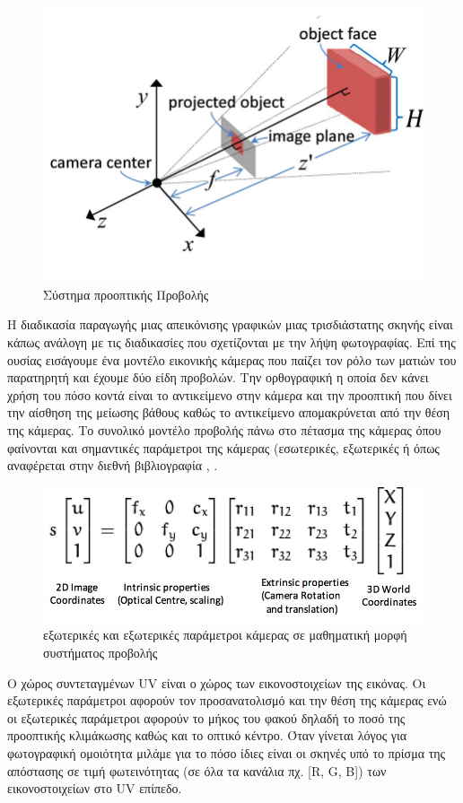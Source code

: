 \begin{appendices}
\begin{figure}[!tbh]
        \centering
        \includegraphics[width=.5\linewidth]{images/chapter2_img/Diagram-of-perspective-camera-model-in-3D.jpg}
        \caption{Σύστημα προοπτικής Προβολής \cite{article}}
        \label{fig:perspectiveProjection}
    \end{figure}
    Η διαδικασία παραγωγής μιας απεικόνισης γραφικών μιας τρισδιάστατης σκηνής είναι κάπως ανάλογη με τις διαδικασίες που σχετίζονται με την λήψη φωτογραφίας. Επί της ουσίας εισάγουμε ένα μοντέλο εικονικής κάμερας που παίζει τον ρόλο των ματιών του παρατηρητή και έχουμε δύο είδη προβολών. Την ορθογραφική η οποία δεν κάνει χρήση του πόσο κοντά είναι το αντικείμενο στην κάμερα και την προοπτική που δίνει την αίσθηση της μείωσης βάθους καθώς το αντικείμενο απομακρύνεται από την θέση της κάμερας. Το συνολικό μοντέλο προβολής πάνω στο πέτασμα της κάμερας όπου φαίνονται και σημαντικές παράμετροι της κάμερας (εσωτερικές, εξωτερικές ή όπως αναφέρεται στην διεθνή βιβλιογραφία , .
    \begin{figure}[!tbh]
        \centering
        \includegraphics[width=0.4\linewidth]{images/chapter2_img/camera_properties_projection_system.jpg}
        \caption{εξωτερικές και εξωτερικές παράμετροι κάμερας σε μαθηματική μορφή συστήματος προβολής}
        \label{fig:intristicsextristics}
    \end{figure}
    
    Ο χώρος συντεταγμένων UV είναι ο χώρος των εικονοστοιχείων της εικόνας. Οι εξωτερικές παράμετροι αφορούν τον προσανατολισμό και την θέση της κάμερας ενώ οι εξωτερικές παράμετροι αφορούν το μήκος του φακού δηλαδή το ποσό της προοπτικής κλιμάκωσης καθώς και το οπτικό κέντρο. Όταν γίνεται λόγος για φωτογραφική ομοιότητα μιλάμε για το πόσο ίδιες είναι οι σκηνές υπό το πρίσμα της απόστασης σε τιμή φωτεινότητας (σε όλα τα κανάλια πχ. [R, G, B]) των εικονοστοιχείων στο UV επίπεδο.



\end{appendices}
